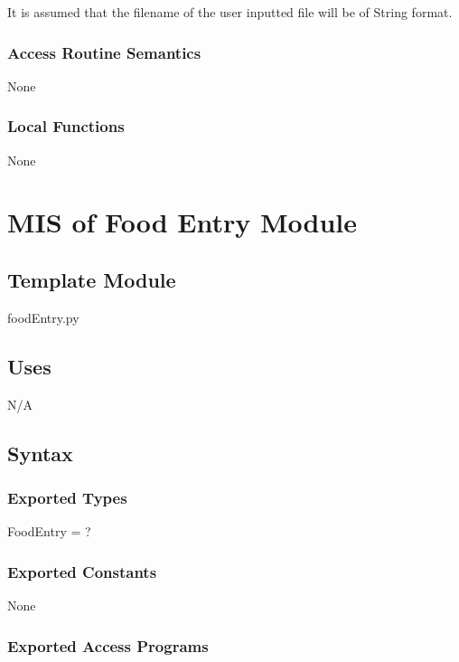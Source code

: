 \documentclass[12pt, titlepage]{article}
\begin{document}
It is assumed that the filename of the user inputted file will be of String format.

\subsubsection{Access Routine Semantics}

None

\subsubsection{Local Functions}

None

\newpage

\section{MIS of Food Entry Module} \label{Module} 



\subsection{Template Module}

foodEntry.py

\subsection{Uses}
N/A

\subsection{Syntax}

\subsubsection{Exported Types}
FoodEntry = ?

\subsubsection{Exported Constants}
None

\subsubsection{Exported Access Programs}
\end{document}

